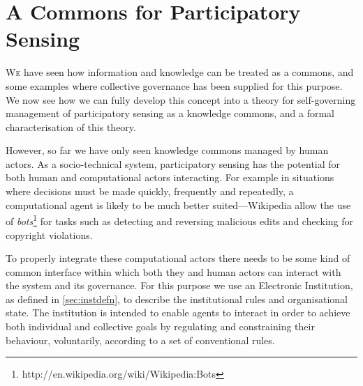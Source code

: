 

\acresetall
\chapter{A Commons for Participatory Sensing}\label{sec:iad}



\lettrine[lines=3]{W}{e} have seen how information and knowledge can be treated as a commons, and
some examples where collective governance has been supplied for this purpose.
We now see how we can fully develop this concept into a theory for 
self-governing management of participatory sensing as a knowledge commons, and a
formal characterisation of this theory.

However, so far we have only seen knowledge commons managed by human actors.
As a socio-technical system, participatory sensing has the potential for both
human and computational actors interacting.  For example in situations where
decisions must be made quickly, frequently and repeatedly, a computational
agent is likely to be much better suited---Wikipedia allow the use of
\emph{bots}\footnote{http://en.wikipedia.org/wiki/Wikipedia:Bots} for tasks
such as detecting and reversing malicious edits and checking for copyright
violations.

To properly integrate these computational actors there needs to be
some kind of common interface within which both they and human actors can
interact with the system and its governance. For this purpose we use an
Electronic Institution, as defined in \autoref{sec:instdefn}, to describe the
institutional rules and organisational state. The institution is intended to
enable agents to interact in order to achieve both individual and collective
goals by regulating and constraining their behaviour, voluntarily, according
to a set of conventional rules.


